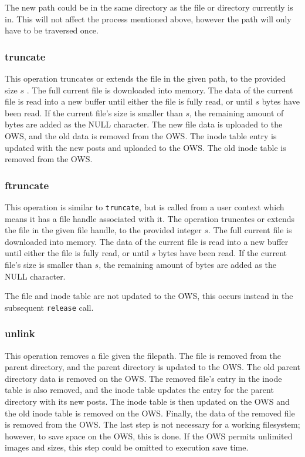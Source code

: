 The new path could be in the same directory as the file or directory currently is in. This will not affect the process mentioned above, however the path will only have to be traversed once.

\subsubsection{truncate}
This operation truncates or extends the file in the given path, to the provided size $s$ . The full current file is downloaded into memory. The data of the current file is read into a new buffer until either the file is fully read, or until $s$ bytes have been read. If the current file's size is smaller than $s$, the remaining amount of bytes are added as the NULL character. The new file data is uploaded to the OWS, and the old data is removed from the OWS. The inode table entry is updated with the new posts and uploaded to the OWS. The old inode table is removed from the OWS.

\subsubsection{ftruncate}
This operation is similar to \texttt{truncate}, but is called from a user context which means it has a file handle associated with it. The operation truncates or extends the file in the given file handle, to the provided integer $s$. The full current file is downloaded into memory. The data of the current file is read into a new buffer until either the file is fully read, or until $s$ bytes have been read. If the current file's size is smaller than $s$, the remaining amount of bytes are added as the NULL character.

The file and inode table are not updated to the OWS, this occurs instead in the subsequent \texttt{release} call.

\subsubsection{unlink}
This operation removes a file given the filepath. The file is removed from the parent directory, and the parent directory is updated to the OWS. The old parent directory data is removed on the OWS. The removed file's entry in the inode table is also removed, and the inode table updates the entry for the parent directory with its new posts. The inode table is then updated on the OWS and the old inode table is removed on the OWS. Finally, the data of the removed file is removed from the OWS. The last step is not necessary for a working filesystem; however, to save space on the OWS, this is done. If the OWS permits unlimited images and sizes, this step could be omitted to execution save time.

